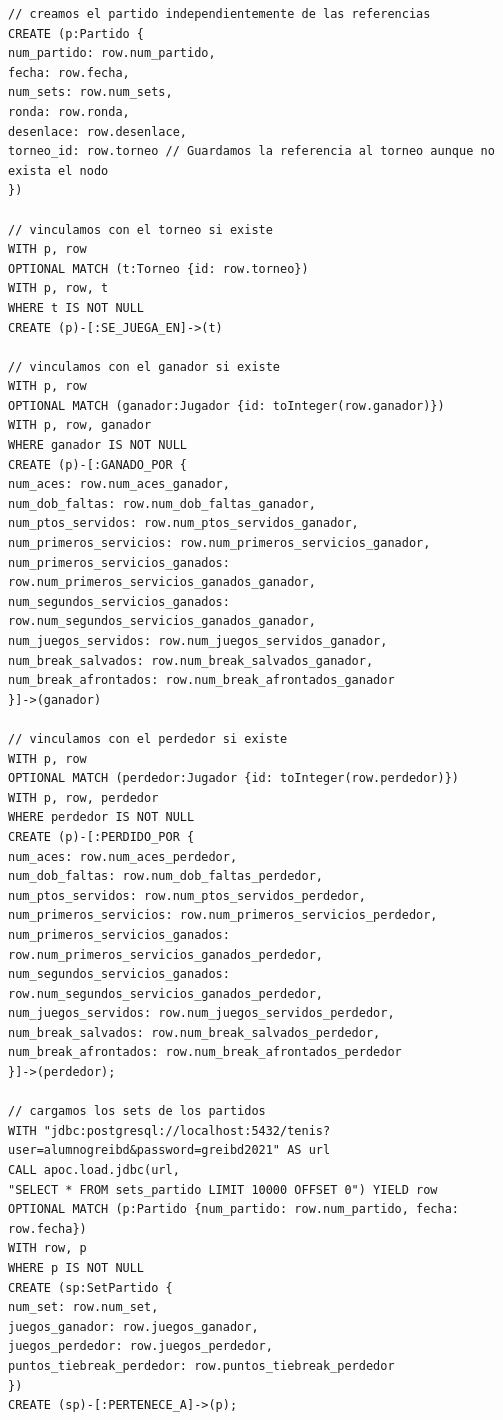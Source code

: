 \documentclass[11pt]{opticajnl}
\begin{document}
\begin{lstlisting}[language=Cypher]
// creamos el partido independientemente de las referencias
CREATE (p:Partido {
num_partido: row.num_partido,
fecha: row.fecha,
num_sets: row.num_sets,
ronda: row.ronda,
desenlace: row.desenlace,
torneo_id: row.torneo // Guardamos la referencia al torneo aunque no exista el nodo
})

// vinculamos con el torneo si existe
WITH p, row
OPTIONAL MATCH (t:Torneo {id: row.torneo})
WITH p, row, t
WHERE t IS NOT NULL
CREATE (p)-[:SE_JUEGA_EN]->(t)

// vinculamos con el ganador si existe
WITH p, row
OPTIONAL MATCH (ganador:Jugador {id: toInteger(row.ganador)})
WITH p, row, ganador
WHERE ganador IS NOT NULL
CREATE (p)-[:GANADO_POR {
num_aces: row.num_aces_ganador,
num_dob_faltas: row.num_dob_faltas_ganador,
num_ptos_servidos: row.num_ptos_servidos_ganador,
num_primeros_servicios: row.num_primeros_servicios_ganador,
num_primeros_servicios_ganados: row.num_primeros_servicios_ganados_ganador,
num_segundos_servicios_ganados: row.num_segundos_servicios_ganados_ganador,
num_juegos_servidos: row.num_juegos_servidos_ganador,
num_break_salvados: row.num_break_salvados_ganador,
num_break_afrontados: row.num_break_afrontados_ganador
}]->(ganador)

// vinculamos con el perdedor si existe
WITH p, row
OPTIONAL MATCH (perdedor:Jugador {id: toInteger(row.perdedor)})
WITH p, row, perdedor
WHERE perdedor IS NOT NULL
CREATE (p)-[:PERDIDO_POR {
num_aces: row.num_aces_perdedor,
num_dob_faltas: row.num_dob_faltas_perdedor,
num_ptos_servidos: row.num_ptos_servidos_perdedor,
num_primeros_servicios: row.num_primeros_servicios_perdedor,
num_primeros_servicios_ganados: row.num_primeros_servicios_ganados_perdedor,
num_segundos_servicios_ganados: row.num_segundos_servicios_ganados_perdedor,
num_juegos_servidos: row.num_juegos_servidos_perdedor,
num_break_salvados: row.num_break_salvados_perdedor,
num_break_afrontados: row.num_break_afrontados_perdedor
}]->(perdedor);

// cargamos los sets de los partidos
WITH "jdbc:postgresql://localhost:5432/tenis?user=alumnogreibd&password=greibd2021" AS url
CALL apoc.load.jdbc(url,
"SELECT * FROM sets_partido LIMIT 10000 OFFSET 0") YIELD row
OPTIONAL MATCH (p:Partido {num_partido: row.num_partido, fecha: row.fecha})
WITH row, p
WHERE p IS NOT NULL
CREATE (sp:SetPartido {
num_set: row.num_set,
juegos_ganador: row.juegos_ganador,
juegos_perdedor: row.juegos_perdedor,
puntos_tiebreak_perdedor: row.puntos_tiebreak_perdedor
})
CREATE (sp)-[:PERTENECE_A]->(p);
\end{lstlisting}
\end{document}
